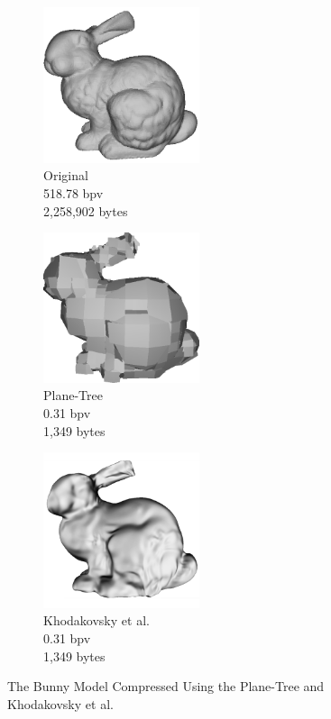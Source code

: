 \begin{figure}[H] 
        \begin{center}
 		\begin{subfigure}[b]{2in}
 			   \centering
 			   \includegraphics[width=1.8in]{images/experiments/pt_qual/original2}
				\captionsetup{justification=centering}
                \caption{Original\\518.78 bpv\\2,258,902 bytes}
                \label{fig:PT_SOTAQ2_ORIG}
        \end{subfigure}%
        \begin{subfigure}[b]{2in}
                \includegraphics[width=1.8in]{images/experiments/pt_qual/planetree2_shade}
                \captionsetup{justification=centering}
                \caption{Plane-Tree\\0.31 bpv\\1,349 bytes}
                \label{fig:PT_SOTAQ1_PLT}
        \end{subfigure}%
        \begin{subfigure}[b]{2in}
                \includegraphics[width=1.8in]{images/experiments/pt_qual/khodakovsky_shade}
                \captionsetup{justification=centering}
                \caption{Khodakovsky et al. \cite{Khodakovsky00Progressive}\\0.31 bpv\\1,349 bytes}
                \label{fig:PT_SOTAQ1_KHKY}
        \end{subfigure}
       \caption{The Bunny Model Compressed Using the Plane-Tree and Khodakovsky et al.}
       \label{fig:qualSOTA2}
       \end{center}
\end{figure}

